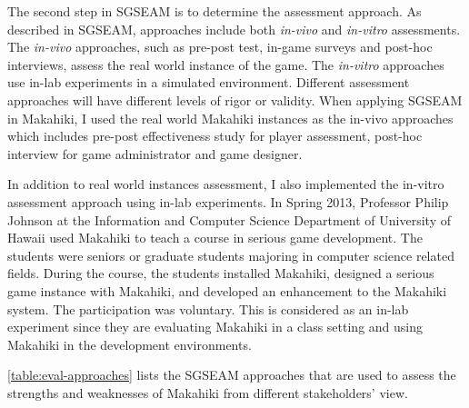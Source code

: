 The second step in SGSEAM is to determine the assessment approach. As described in SGSEAM, approaches include both  {\em in-vivo} and {\em in-vitro} assessments. The  {\em in-vivo} approaches, such as pre-post test, in-game surveys and post-hoc interviews, assess the real world instance of the game. The {\em in-vitro} approaches use in-lab experiments in a simulated environment. Different assessment approaches will have different levels of rigor or validity. When applying SGSEAM in Makahiki, I used the real world Makahiki instances as the in-vivo approaches which includes pre-post effectiveness study for player assessment, post-hoc interview for game administrator and game designer. 

In addition to real world instances assessment, I also implemented the in-vitro assessment approach using in-lab experiments. In Spring 2013, Professor Philip Johnson at the Information and Computer Science Department of University of Hawaii used Makahiki to teach a course in serious game development. The students were seniors or graduate students majoring in computer science related fields. During the course, the students installed Makahiki, designed a serious game instance with Makahiki, and developed an enhancement to the Makahiki system.
The participation was voluntary. This is considered as an in-lab experiment since they are evaluating Makahiki in a class setting and using Makahiki in the development environments.

\autoref{table:eval-approaches} lists the SGSEAM approaches that are used to assess the strengths and weaknesses of Makahiki from different stakeholders' view.


